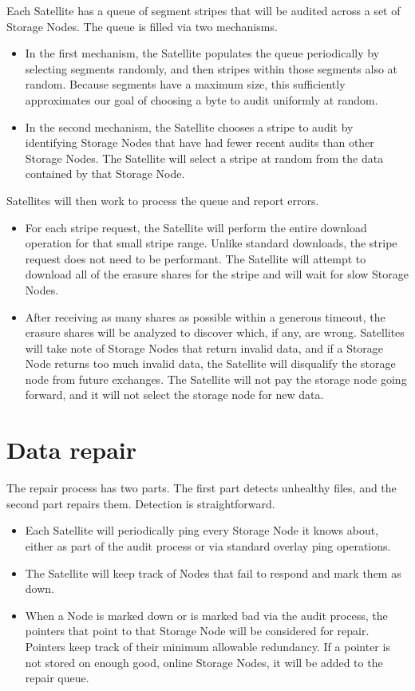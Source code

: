\documentclass[8pt,fleqn,openany]{book}
\begin{document}
Each Satellite has a queue of segment stripes that will be audited across
  a set of Storage Nodes. The queue is filled via two mechanisms.
  \begin{itemize}
  \item In the first mechanism, the Satellite populates the queue periodically
    by selecting segments randomly, and then stripes within those segments also
    at random. Because segments have a maximum size, this sufficiently
    approximates our goal of choosing a byte to audit uniformly at random.
  \item In the second mechanism, the Satellite chooses a stripe to audit by
    identifying Storage Nodes that have had fewer recent audits than other
    Storage Nodes. The Satellite will select a stripe at random from the data
    contained by that Storage Node.
  \end{itemize}

Satellites will then work to process the queue and report errors.
\begin{itemize}
\item For each stripe request, the Satellite will perform the entire download
  operation for that small stripe range. Unlike standard downloads, the stripe
  request does not need to be performant. The Satellite will attempt to
  download all of the erasure shares for the stripe and will wait for slow
  Storage Nodes.
\item After receiving as many shares as possible within a generous timeout,
  the erasure shares will be analyzed to discover which, if any, are wrong.
  Satellites will take note of Storage Nodes that return invalid data, and if a
  Storage Node returns too much invalid data, the Satellite will disqualify
  the storage node from future exchanges. The Satellite will not pay the storage
  node going forward, and it will not select the storage node for new data.
\end{itemize}

\section{Data repair}

The repair process has two parts. The first part detects unhealthy files, and
the second part repairs them. Detection is straightforward.

\begin{itemize}
\item Each Satellite will periodically ping every Storage Node it knows
about, either as part of the audit process or via standard overlay ping operations.
\item The Satellite will keep track of Nodes that fail to respond and mark
  them as down.
\item When a Node is marked down or is marked bad via the audit process, the
  pointers that point to that Storage Node will be considered for repair.
  Pointers
  keep track of their minimum allowable redundancy. If a pointer is not stored
  on enough good, online Storage Nodes, it will be added to the repair queue.
\end{itemize}
\end{document}
